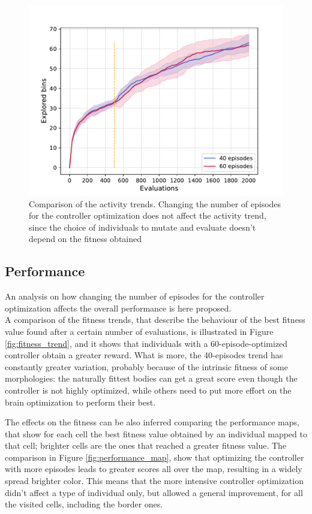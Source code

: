 \begin{figure}[H]
    \centering
    \includegraphics[scale=0.65]{images/brain_opt/walker/comp_40_60eps_at}
    \caption{Comparison of the activity trends. Changing the number of episodes for the controller optimization does not affect the activity trend, since the choice of individuals to mutate and evaluate doesn't depend on the fitness obtained}
    \label{fig:activity_trend}
\end{figure}

\subsection{Performance}
An analysis on how changing the number of episodes for the controller optimization affects the overall performance is here proposed.\\
A comparison of the fitness trends, that describe the behaviour of the best fitness value found after a certain number of evaluations, is illustrated in Figure \ref{fig:fitness_trend}, and it shows that individuals with a 60-episode-optimized controller obtain a greater reward. What is more, the 40-episodes trend has constantly greater variation, probably because of the intrinsic fitness of some morphologies: the naturally fittest bodies can get a great score even though the controller is not highly optimized, while others need to put more effort on the brain optimization to perform their best.

The effects on the fitness can be also inferred comparing the performance maps, that show for each cell the best fitness value obtained by an individual mapped to that cell; brighter cells are the ones that reached a greater fitness value.
The comparison in Figure \ref{fig:performance_map}, show that optimizing the controller with more episodes leads to greater scores all over the map, resulting in a widely spread brighter color.
This means that the more intensive controller optimization didn't affect a type of individual only, but allowed a general improvement, for all the visited cells, including the border ones.

